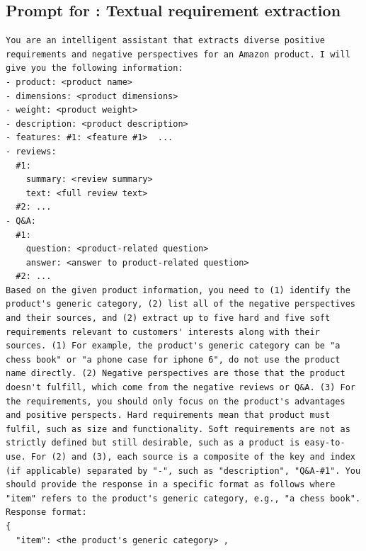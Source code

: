 

\begin{mdframed}[backgroundcolor=cyan!5, linecolor=black, linewidth=2pt, 
                innerleftmargin=10pt, innerrightmargin=10pt, 
                innertopmargin=3pt, innerbottommargin=10pt]
\section*{Prompt for \amazont: Textual requirement extraction}
\begin{lstlisting}
You are an intelligent assistant that extracts diverse positive requirements and negative perspectives for an Amazon product. I will give you the following information:
- product: <product name>
- dimensions: <product dimensions>
- weight: <product weight>
- description: <product description>
- features: #1: <feature #1>  ...
- reviews: 
  #1:
    summary: <review summary>
    text: <full review text>
  #2: ...
- Q&A: 
  #1:
    question: <product-related question>
    answer: <answer to product-related question>
  #2: ...
Based on the given product information, you need to (1) identify the product's generic category, (2) list all of the negative perspectives and their sources, and (2) extract up to five hard and five soft requirements relevant to customers' interests along with their sources. (1) For example, the product's generic category can be "a chess book" or "a phone case for iphone 6", do not use the product name directly. (2) Negative perspectives are those that the product doesn't fulfill, which come from the negative reviews or Q&A. (3) For the requirements, you should only focus on the product's advantages and positive perspects. Hard requirements mean that product must fulfil, such as size and functionality. Soft requirements are not as strictly defined but still desirable, such as a product is easy-to-use. For (2) and (3), each source is a composite of the key and index (if applicable) separated by "-", such as "description", "Q&A-#1". You should provide the response in a specific format as follows where "item" refers to the product's generic category, e.g., "a chess book". 
Response format:
{
  "item": <the product's generic category> ,

\end{lstlisting}
\end{mdframed}
